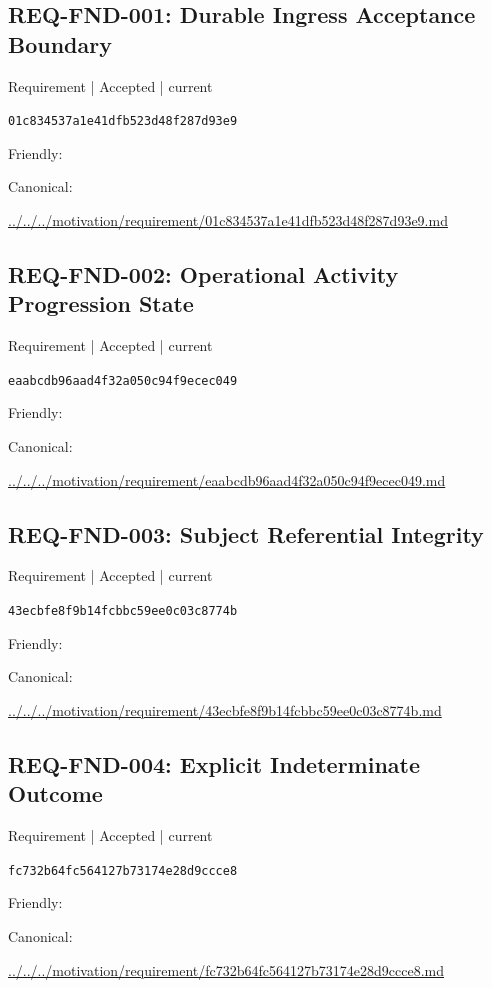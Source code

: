 \documentclass[10pt,a4paper]{article}
\begin{document}
\subsection*{REQ-FND-001: Durable Ingress Acceptance Boundary}
{\small Requirement | Accepted | current}\par
\texttt{01c834537a1e41dfb523d48f287d93e9}\par
Friendly: \par
Canonical: \par
{\footnotesize\url{../../../motivation/requirement/01c834537a1e41dfb523d48f287d93e9.md}}\par
\subsection*{REQ-FND-002: Operational Activity Progression State}
{\small Requirement | Accepted | current}\par
\texttt{eaabcdb96aad4f32a050c94f9ecec049}\par
Friendly: \par
Canonical: \par
{\footnotesize\url{../../../motivation/requirement/eaabcdb96aad4f32a050c94f9ecec049.md}}\par
\subsection*{REQ-FND-003: Subject Referential Integrity}
{\small Requirement | Accepted | current}\par
\texttt{43ecbfe8f9b14fcbbc59ee0c03c8774b}\par
Friendly: \par
Canonical: \par
{\footnotesize\url{../../../motivation/requirement/43ecbfe8f9b14fcbbc59ee0c03c8774b.md}}\par
\subsection*{REQ-FND-004: Explicit Indeterminate Outcome}
{\small Requirement | Accepted | current}\par
\texttt{fc732b64fc564127b73174e28d9ccce8}\par
Friendly: \par
Canonical: \par
{\footnotesize\url{../../../motivation/requirement/fc732b64fc564127b73174e28d9ccce8.md}}\par
\end{document}
